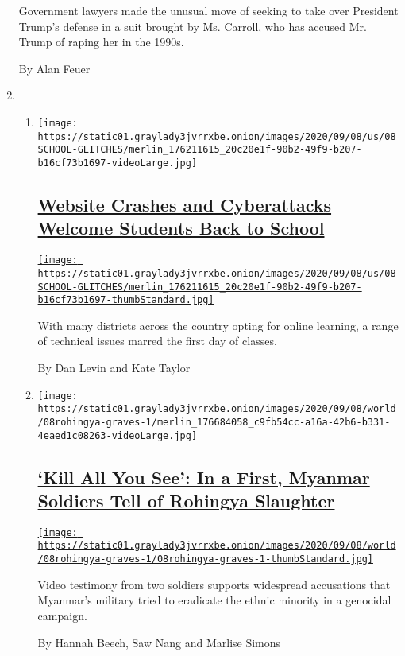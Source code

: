 \begin{enumerate}
  Government lawyers made the unusual move of seeking to take over
  President Trump's defense in a suit brought by Ms. Carroll, who has
  accused Mr. Trump of raping her in the 1990s.

  By Alan Feuer
\item
  \begin{enumerate}
  \def\labelenumii{\arabic{enumii}.}
  \item
    \texttt{[image: https://static01.graylady3jvrrxbe.onion/images/2020/09/08/us/08SCHOOL-GLITCHES/merlin\_176211615\_20c20e1f-90b2-49f9-b207-b16cf73b1697-videoLarge.jpg]}

    \hypertarget{website-crashes-and-cyberattacks-welcome-students-back-to-school}{%
    \subsection{\texorpdfstring{\href{/2020/09/08/us/school-districts-cyberattacks-glitches.html}{Website
    Crashes and Cyberattacks Welcome Students Back to
    School}}{Website Crashes and Cyberattacks Welcome Students Back to School}}\label{website-crashes-and-cyberattacks-welcome-students-back-to-school}}

    \href{/2020/09/08/us/school-districts-cyberattacks-glitches.html}{\texttt{[image: https://static01.graylady3jvrrxbe.onion/images/2020/09/08/us/08SCHOOL-GLITCHES/merlin\_176211615\_20c20e1f-90b2-49f9-b207-b16cf73b1697-thumbStandard.jpg]}}

    With many districts across the country opting for online learning, a
    range of technical issues marred the first day of classes.

    By Dan Levin and Kate Taylor
  \item
    \texttt{[image: https://static01.graylady3jvrrxbe.onion/images/2020/09/08/world/08rohingya-graves-1/merlin\_176684058\_c9fb54cc-a16a-42b6-b331-4eaed1c08263-videoLarge.jpg]}

    \hypertarget{kill-all-you-see-in-a-first-myanmar-soldiers-tell-of-rohingya-slaughter}{%
    \subsection{\texorpdfstring{\href{/2020/09/08/world/asia/myanmar-rohingya-genocide.html}{`Kill
    All You See': In a First, Myanmar Soldiers Tell of Rohingya
    Slaughter}}{`Kill All You See': In a First, Myanmar Soldiers Tell of Rohingya Slaughter}}\label{kill-all-you-see-in-a-first-myanmar-soldiers-tell-of-rohingya-slaughter}}

    \href{/2020/09/08/world/asia/myanmar-rohingya-genocide.html}{\texttt{[image: https://static01.graylady3jvrrxbe.onion/images/2020/09/08/world/08rohingya-graves-1/08rohingya-graves-1-thumbStandard.jpg]}}

    Video testimony from two soldiers supports widespread accusations
    that Myanmar's military tried to eradicate the ethnic minority in a
    genocidal campaign.

    By Hannah Beech, Saw Nang and Marlise Simons
  \end{enumerate}
\end{enumerate}

